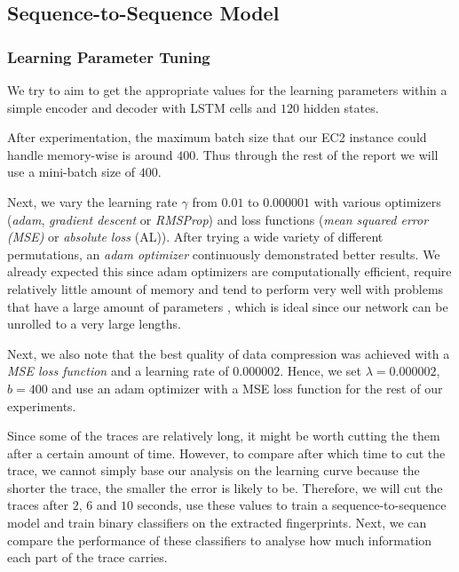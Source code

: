 \newpage

\subsection{Sequence-to-Sequence Model}

\subsubsection{Learning Parameter Tuning}

We try to aim to get the appropriate values for the learning parameters within a simple encoder and decoder with LSTM cells and $120$ hidden states.

After experimentation, the maximum batch size that our EC2 instance could handle memory-wise is around $400$.
Thus through the rest of the report we will use a mini-batch size of $400$.

Next, we vary the learning rate $\gamma$ from $0.01$ to $0.000001$ with various optimizers (\textit{adam}, \textit{gradient descent} or \textit{RMSProp}) and loss functions (\textit{mean squared error (MSE)} or \textit{absolute loss} (AL)).
After trying a wide variety of different permutations, an \textit{adam optimizer} continuously demonstrated better results.
We already expected this since adam optimizers are computationally efficient, require relatively little amount of memory and tend to perform very well with problems that have a large amount of parameters \cite{kingma2014adam},
which is ideal since our network can be unrolled to a very large lengths.

Next, we also note that the best quality of data compression was achieved with a \textit{MSE loss function} and a learning rate of $0.000002$.
Hence, we set $\lambda = 0.000002$, $b = 400$ and use an adam optimizer with a MSE loss function for the rest of our experiments.

Since some of the traces are relatively long, it might be worth cutting the them after a certain amount of time.
However, to compare after which time to cut the trace, we cannot simply base our analysis on the learning curve because the shorter the trace, the smaller the error is likely to be.
Therefore, we will cut the traces after $2$, $6$ and $10$ seconds, use these values to train a sequence-to-sequence model and train binary classifiers on the extracted fingerprints.
Next, we can compare the performance of these classifiers to analyse how much information each part of the trace carries.

